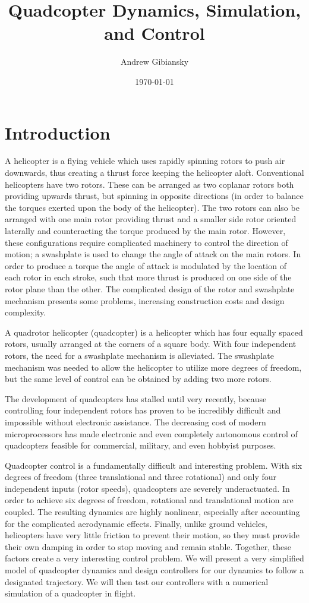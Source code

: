 \documentclass{article}
\author{Andrew Gibiansky}
\date{\today}
\title{Quadcopter Dynamics, Simulation, and Control}
\begin{document}
\maketitle

\section*{Introduction}
A helicopter is a flying vehicle which uses rapidly spinning rotors to push air downwards, thus
creating a thrust force keeping the helicopter aloft. Conventional helicopters have two rotors.
These can be arranged as two coplanar rotors both providing upwards thrust, but spinning in opposite
directions (in order to balance the torques exerted upon the body of the helicopter). The two rotors
can also be arranged with one main rotor providing thrust and a smaller side rotor oriented
laterally and counteracting the torque produced by the main rotor. However, these configurations
require complicated machinery to control the direction of motion; a swashplate is used to change the
angle of attack on the main rotors. In order to produce a torque the angle of attack is modulated by
the location of each rotor in each stroke, such that more thrust is produced on one side of the
rotor plane than the other. The complicated design of the rotor and swashplate mechanism presents
some problems, increasing construction costs and design complexity.

A quadrotor helicopter (quadcopter) is a helicopter which has four equally spaced rotors, usually
arranged at the corners of a square body. With four independent rotors, the need for a swashplate
mechanism is alleviated. The swashplate mechanism was needed to allow the helicopter to utilize more
degrees of freedom, but the same level of control can be obtained by adding two more rotors.


The development of quadcopters has stalled until very recently, because controlling four independent
rotors has proven to be incredibly difficult and impossible without electronic assistance. The
decreasing cost of modern microprocessors has made electronic and even completely autonomous control
of quadcopters feasible for commercial, military, and even hobbyist purposes.

Quadcopter control is a fundamentally difficult and interesting problem. With six degrees of freedom
(three translational and three rotational) and only four independent inputs (rotor speeds),
quadcopters are severely underactuated. In order to achieve six degrees of freedom, rotational and
translational motion are coupled. The resulting dynamics are highly nonlinear, especially after
accounting for the complicated aerodynamic effects. Finally, unlike ground
vehicles, helicopters have very little friction to prevent their motion, so they must provide their
own damping in order to stop moving and remain stable. Together, these factors create a very
interesting control problem. We will present a very simplified model of quadcopter dynamics and
design controllers for our dynamics to follow a designated trajectory. We will then test our
controllers with a numerical simulation of a quadcopter in flight.
\end{document}
